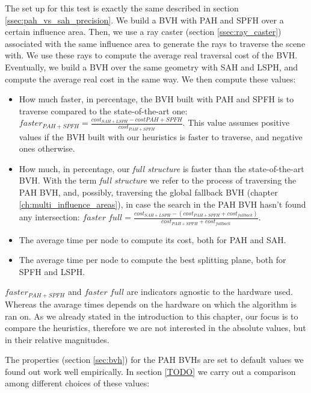 \documentclass{PoliMi_MasterThesis}
\begin{document}
The set up for this test is exactly the same described in section \ref{ssec:pah_vs_sah_precision}. We build a BVH with PAH and SPFH over a certain influence area. Then, we use a ray caster (section \ref{ssec:ray_caster}) associated with the same influence area to generate the rays to traverse the scene with. We use these rays to compute the average real traversal cost of the BVH. Eventually, we build a BVH over the same geometry with SAH and LSPH, and compute the average real cost in the same way. We then compute these values:

\begin{itemize}
	\item How much faster, in percentage, the BVH built with PAH and SPFH is to traverse compared to the state-of-the-art one: $faster_{PAH+SPFH} = \frac{cost_{SAH+LSPH}-cost{PAH+SPFH}}{cost_{PAH+SPFH}}$. This value assumes positive values if the BVH built with our heuristics is faster to traverse, and negative ones otherwise.
	\item How much, in percentage, our \textit{full structure} is faster than the state-of-the-art BVH. With the term \textit{full structure} we refer to the process of traversing the PAH BVH, and, possibly, traversing the global fallback BVH (chapter \ref{ch:multi_influence_areas}), in case the search in the PAH BVH hasn't found any intersection: $faster \; full = \frac{cost_{SAH+LSPH}-(cost_{PAH+SPFH}+cost_{fallback})}{cost_{PAH+SPFH}+cost_{fallback}}$.
	\item The average time per node to compute its cost, both for PAH and SAH.
	\item The average time per node to compute the best splitting plane, both for SPFH and LSPH.
\end{itemize}

$faster_{PAH+SPFH}$ and $faster \; full$ are indicators agnostic to the hardware used. Whereas the avarage times depends on the hardware on which the algorithm is ran on. As we already stated in the introduction to this chapter, our focus is to compare the heuristics, therefore we are not interested in the absolute values, but in their relative magnitudes.

The properties (section \ref{sec:bvh}) for the PAH BVHs are set to default values we found out work well empirically. In section \ref{TODO} we carry out a comparison among different choices of these values:
\end{document}
